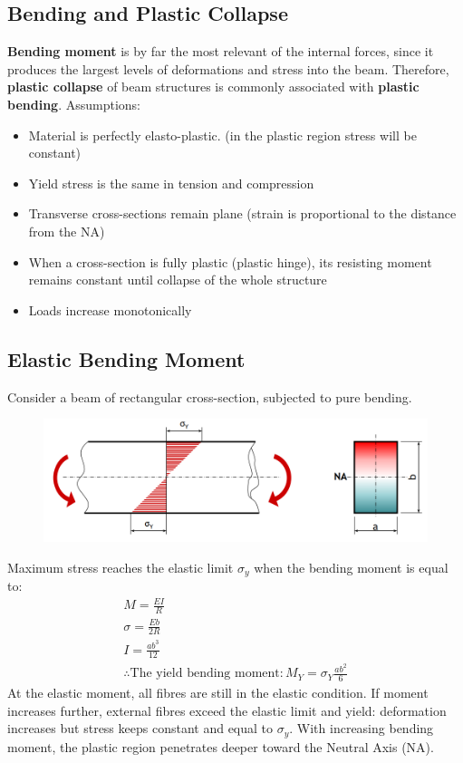 \documentclass[class=report, crop=false, 12pt,a4paper]{standalone}
\begin{document}
\subsection{Bending and Plastic Collapse}
\textbf{Bending moment} is by far the most relevant of the internal forces, since it produces the largest levels of deformations and stress into the beam. Therefore, \textbf{plastic collapse} of beam structures is commonly associated with \textbf{plastic bending}.
Assumptions: 
\begin{itemize}
  \item Material is perfectly elasto-plastic. (in the plastic region stress will be constant)
  \item Yield stress is the same in tension and compression
  \item Transverse cross-sections remain plane (strain is proportional to the distance from the NA)
  \item When a cross-section is fully plastic (plastic hinge), its resisting moment remains constant until collapse of the whole structure
  \item Loads increase monotonically
\end{itemize}
\subsection{Elastic Bending Moment}
Consider a beam of rectangular cross-section, subjected to pure bending.
\begin{figure}[H]
  \centering
  \includegraphics[width = 0.9 \textwidth]{../img/beam14.PNG}
\end{figure}
Maximum stress reaches the elastic limit $\sigma_y$ when the bending moment is equal to:
\begin{gather}
  M = \frac{EI}{R} \\
  \sigma = \frac{Eb}{2R} \\
  I = \frac{ab^3}{12} \\
  \therefore \text{The yield bending moment}: M_Y = \sigma_Y\frac{ab^2}{6}
\end{gather}
At the elastic moment, all fibres are still in the elastic condition. 
If moment increases further, external fibres exceed the elastic limit and yield: deformation increases but stress keeps constant and equal to $\sigma_y$. 
With increasing bending moment, the plastic region penetrates deeper toward the Neutral Axis (NA).
\end{document}
